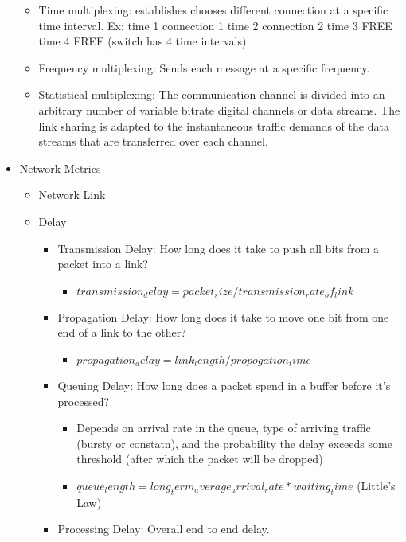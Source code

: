 \documentclass[]{article}
\providecommand{\tightlist}{%
  \setlength{\itemsep}{0pt}\setlength{\parskip}{0pt}}
\begin{document}
\begin{itemize}
  \begin{itemize}
  \tightlist
  \item
    Time multiplexing: establishes chooses different connection at a
    specific time interval. Ex: time 1 connection 1 time 2 connection 2
    time 3 FREE time 4 FREE (switch has 4 time intervals)
  \item
    Frequency multiplexing: Sends each message at a specific
    frequency.\\
  \item
    Statistical multiplexing: The communication channel is divided into
    an arbitrary number of variable bitrate digital channels or data
    streams. The link sharing is adapted to the instantaneous traffic
    demands of the data streams that are transferred over each channel.
  \end{itemize}
\item
  Network Metrics

  \begin{itemize}
  \tightlist
  \item
    Network Link
  \item
    Delay

    \begin{itemize}
    \tightlist
    \item
      Transmission Delay: How long does it take to push all bits from a
      packet into a link?

      \begin{itemize}
      \tightlist
      \item
        \(transmission_delay = packet_size / transmission_rate_of_link\)
      \end{itemize}
    \item
      Propagation Delay: How long does it take to move one bit from one
      end of a link to the other?

      \begin{itemize}
      \tightlist
      \item
        \(propagation_delay = link_length / propogation_time\)
      \end{itemize}
    \item
      Queuing Delay: How long does a packet spend in a buffer before
      it's processed?

      \begin{itemize}
      \tightlist
      \item
        Depends on arrival rate in the queue, type of arriving traffic
        (bursty or constatn), and the probability the delay exceeds some
        threshold (after which the packet will be dropped)
      \item
        \(queue_length = long_term_average_arrival_rate * waiting_time\)
        (Little's Law)
      \end{itemize}
    \item
      Processing Delay: Overall end to end delay.
    \end{itemize}
  \end{itemize}
\end{itemize}
\end{document}
